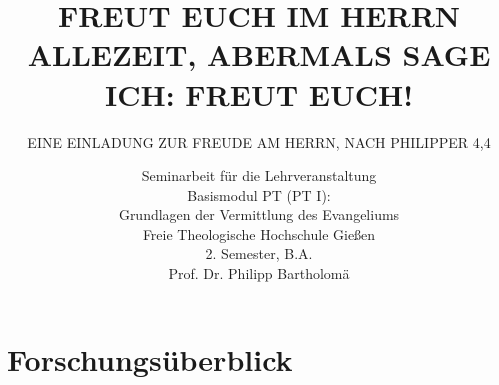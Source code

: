 


\addtocounter{tocdepth}{1}
\addtocounter{secnumdepth}{1}


\title{\MakeUppercase{Freut euch im Herrn allezeit, abermals sage ich: Freut euch!}} %
\subtitle{\MakeUppercase {Eine Einladung zur Freude am Herrn, nach Philipper 4,4}}
\author{Seminarbeit für die Lehrveranstaltung\\
Basismodul PT (PT I):\\
Grundlagen der Vermittlung des Evangeliums\\ %
Freie Theologische Hochschule Gießen\\
2. Semester, B.A.\\
Prof. Dr. Philipp Bartholomä}
\date{ } %

\publishers{Florian Kurrle\\ \today} %
\maketitle


\tableofcontents
\pagestyle{headings}


\chapter{\label{Forschung}Forschungsüberblick}
